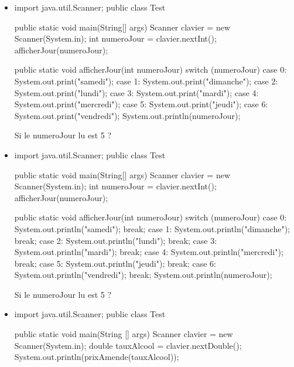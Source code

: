 \documentclass[11pt,a4paper]{article}
\begin{document}
					\begin{itemize}
				
			\item \begin{Java}
import java.util.Scanner;
public class Test{
  public static void main(String[] args){
      Scanner clavier = new Scanner(System.in);
      int numeroJour = clavier.nextInt();
      afficherJour(numeroJour);
  }
    
  public static void afficherJour(int numeroJour){
      switch (numeroJour) {
        case 0: System.out.print("samedi");
        case 1: System.out.print("dimanche");
        case 2: System.out.print("lundi");
        case 3: System.out.print("mardi");
        case 4: System.out.print("mercredi");
        case 5: System.out.print("jeudi");
        case 6: System.out.print("vendredi");
      }
      System.out.println(numeroJour);
  }
}
				\end{Java}Si le numeroJour lu est 5 ? 
            \par
         \textcolor{gray}{\underline{\hspace*{10em}}} 
			\item \begin{Java}
import java.util.Scanner;
public class Test{
  public static void main(String[] args){
      Scanner clavier = new Scanner(System.in);
      int numeroJour = clavier.nextInt();
      afficherJour(numeroJour);
  }
    
  public static void afficherJour(int numeroJour){
      switch (numeroJour) {
        case 0: System.out.println("samedi"); break;
        case 1: System.out.println("dimanche"); break;
        case 2: System.out.println("lundi"); break;
        case 3: System.out.println("mardi"); break;
        case 4: System.out.println("mercredi"); break;
        case 5: System.out.println("jeudi"); break;
        case 6: System.out.println("vendredi"); break;
      }
      System.out.println(numeroJour);
  }
}
				\end{Java}Si le numeroJour lu est 5 ? 
            \par
         \textcolor{gray}{\underline{\hspace*{5em}}} 
			\item \begin{Java}

import java.util.Scanner;
public class Test {
    public static void main(String [] args) {
      Scanner clavier = new Scanner(System.in);
      double tauxAlcool = clavier.nextDouble();
      System.out.println(prixAmende(tauxAlcool));
    }
    
}
\end{Java}
\end{itemize}
\end{document}
